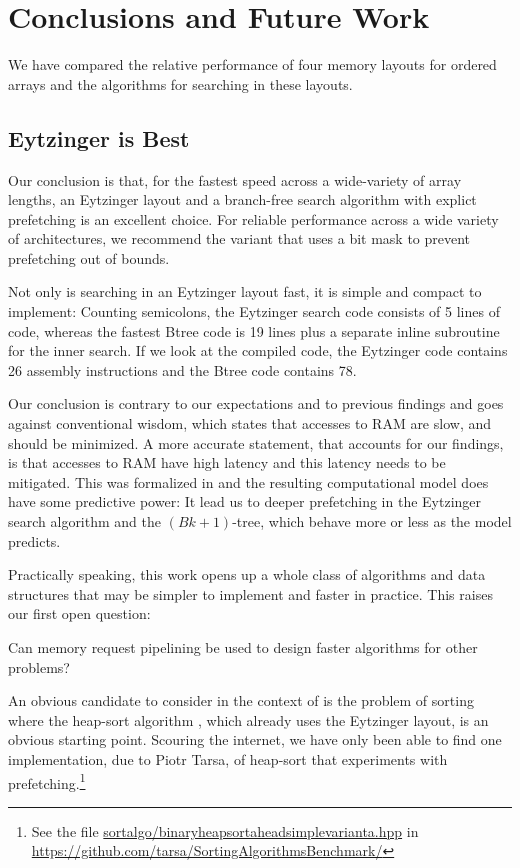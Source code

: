 \documentclass{patmorin}
\begin{document}
\section{Conclusions and Future Work}

We have compared the relative performance of four memory layouts for
ordered arrays and the algorithms for searching in these layouts.

\subsection{Eytzinger is Best}
Our conclusion is that, for the fastest speed across a wide-variety of
array lengths, an Eytzinger layout and a branch-free search algorithm with
explict prefetching is an excellent choice.  For reliable performance
across a wide variety of architectures, we recommend the variant that
uses a bit mask to prevent prefetching out of bounds.

Not only is searching in an Eytzinger layout fast, it is simple and
compact to implement: Counting semicolons, the Eytzinger search code
consists of 5 lines of code, whereas the fastest Btree code is 19 lines
plus a separate inline subroutine for the inner search.  If we look at
the compiled code, the Eytzinger code contains 26 assembly instructions
and the Btree code contains 78.

Our conclusion is contrary to our expectations and to previous findings
and goes against conventional wisdom, which states that accesses to
RAM are slow, and should be minimized.  A more accurate statement, that
accounts for our findings, is that accesses to RAM have high latency and
this latency needs to be mitigated.  This was formalized in 
and the resulting computational model does have some predictive power:
It lead us to deeper prefetching in the Eytzinger search algorithm and
the $(Bk+1)$-tree, which behave more or less as the model predicts.

Practically speaking, this work opens up a whole class of algorithms
and data structures that may be simpler to implement and faster in
practice.  This raises our first open question:

\begin{op}
  Can memory request pipelining be used to design faster algorithms for
  other problems?
\end{op}

An obvious candidate to consider in the context of 
is the problem of sorting where the heap-sort algorithm
\cite{floyd:algorithm,williams:algorithm}, which already uses the
Eytzinger layout, is an obvious starting point. Scouring the internet,
we have only been able to find one implementation, due to Piotr Tarsa,
of heap-sort that experiments with prefetching.\footnote{See the
file \url{sortalgo/binaryheapsortaheadsimplevarianta.hpp}
in \url{https://github.com/tarsa/SortingAlgorithmsBenchmark/}}
\end{document}
